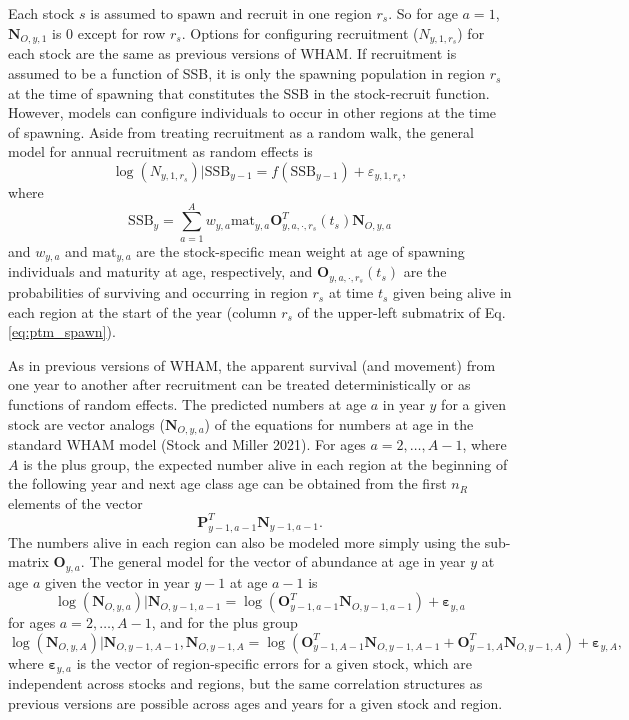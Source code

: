 \documentclass[
]{article}
\begin{document}
Each stock \(s\) is assumed to spawn and recruit in one region \(r_s\). So for age \(a=1\), \(\mathbf{N}_{O,y,1}\) is 0 except for row \(r_s\). Options for configuring recruitment (\(N_{y,1,r_s}\)) for each stock are the same as previous versions of WHAM. If recruitment is assumed to be a function of SSB, it is only the spawning population in region \(r_s\) at the time of spawning that constitutes the SSB in the stock-recruit function. However, models can configure individuals to occur in other regions at the time of spawning. Aside from treating recruitment as a random walk, the general model for annual recruitment as random effects is
\begin{equation*}
\log\left(N_{y,1,r_s}\right)|\text{SSB}_{y-1} =  f\left(\text{SSB}_{y-1}\right) + \varepsilon_{y,1,r_s},
\end{equation*}
where\\
\[\text{SSB}_{y} =  \sum^A_{a=1}  w_{y,a} \text{mat}_{y,a} \mathbf{O}_{y,a,\cdot,r_s}^T(t_s) \mathbf{N}_{O,y,a}\]
and \(w_{y,a}\) and \(\text{mat}_{y,a}\) are the stock-specific mean weight at age of spawning individuals and maturity at age, respectively, and \(\mathbf{O}_{y,a,\cdot,r_s}(t_s)\) are the probabilities of surviving and occurring in region \(r_s\) at time \(t_s\) given being alive in each region at the start of the year (column \(r_s\) of the upper-left submatrix of Eq. \ref{eq:ptm_spawn}).

As in previous versions of WHAM, the apparent survival (and movement) from one year to another after recruitment can be treated deterministically or as functions of random effects. The predicted numbers at age \(a\) in year \(y\) for a given stock are vector analogs (\(\mathbf{N}_{O,y,a}\)) of the equations for numbers at age in the standard WHAM model (Stock and Miller 2021). For ages \(a = 2,\ldots, A-1\), where \(A\) is the plus group, the expected number alive in each region at the beginning of the following year and next age class age can be obtained from the first \(n_R\) elements of the vector
\[\mathbf{P}_{y-1,a-1}^T \mathbf{N}_{y-1,a-1}.\]
The numbers alive in each region can also be modeled more simply using the sub-matrix \(\mathbf{O}_{y,a}\). The general model for the vector of abundance at age in year \(y\) at age \(a\) given the vector in year \(y-1\) at age \(a-1\) is
\begin{equation*}
\log\left(\mathbf{N}_{O,y,a}\right)|\mathbf{N}_{O,y-1,a-1} =  \log\left(\mathbf{O}_{y-1,a-1}^T \mathbf{N}_{O,y-1,a-1}\right) + \boldsymbol{\varepsilon}_{y,a}
\end{equation*}
for ages \(a = 2,\ldots, A-1\), and for the plus group
\begin{equation*}
\log\left(\mathbf{N}_{O,y,A}\right)|\mathbf{N}_{O,y-1,A-1},\mathbf{N}_{O,y-1,A} = \log\left(\mathbf{O}_{y-1,A-1}^T \mathbf{N}_{O,y-1,A-1} + \mathbf{O}_{y-1,A}^T \mathbf{N}_{O,y-1,A}\right) + \boldsymbol{\varepsilon}_{y,A},
\end{equation*}
where \(\boldsymbol{\varepsilon}_{y,a}\) is the vector of region-specific errors for a given stock, which are independent across stocks and regions, but the same correlation structures as previous versions are possible across ages and years for a given stock and region.
\end{document}
